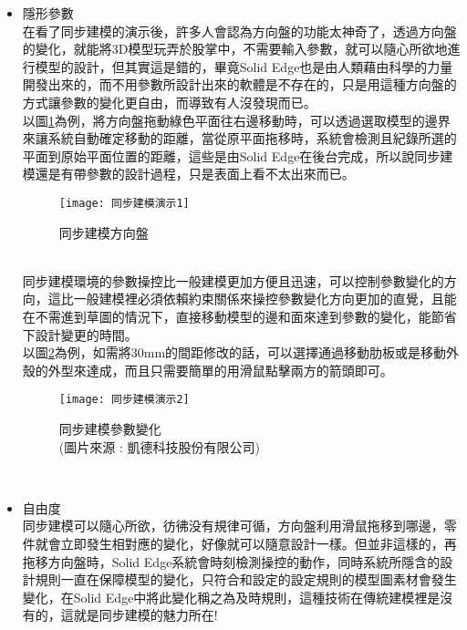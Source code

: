 \begin{itemize}
\item 隱形參數\\
在看了同步建模的演示後，許多人會認為方向盤的功能太神奇了，透過方向盤的變化，就能將3D模型玩弄於股掌中，不需要輸入參數，就可以隨心所欲地進行模型的設計，但其實這是錯的，畢竟Solid Edge也是由人類藉由科學的力量開發出來的，而不用參數所設計出來的軟體是不存在的，只是用這種方向盤的方式讓參數的變化更自由，而導致有人沒發現而已。\\
以圖\ref{2.79}為例，將方向盤拖動綠色平面往右邊移動時，可以透過選取模型的邊界來讓系統自動確定移動的距離，當從原平面拖移時，系統會檢測且紀錄所選的平面到原始平面位置的距離，這些是由Solid Edge在後台完成，所以說同步建模還是有帶參數的設計過程，只是表面上看不太出來而已。\\
\begin{figure}[hbt!]
\begin{center}
\texttt{[image: 同步建模演示1]}
\caption{\Large 同步建模方向盤}\label{2.79}
\end{center}
\end{figure}
\\
同步建模環境的參數操控比一般建模更加方便且迅速，可以控制參數變化的方向，這比一般建模裡必須依賴約束關係來操控參數變化方向更加的直覺，且能在不需進到草圖的情況下，直接移動模型的邊和面來達到參數的變化，能節省下設計變更的時間。\\
以圖\ref{2.80}為例，如需將30mm的間距修改的話，可以選擇通過移動肋板或是移動外殼的外型來達成，而且只需要簡單的用滑鼠點擊兩方的箭頭即可。\\
\begin{figure}[hbt!]
\begin{center}
\texttt{[image: 同步建模演示2]}
\caption{\Large 同步建模參數變化\\(圖片來源 : 凱德科技股份有限公司)}\label{2.80}
\end{center}
\end{figure}
\\
\item 自由度\\

同步建模可以隨心所欲，彷彿没有規律可循，方向盤利用滑鼠拖移到哪邊，零件就會立即發生相對應的變化，好像就可以隨意設計一樣。但並非這樣的，再拖移方向盤時，Solid Edge系統會時刻檢測操控的動作，同時系統所隱含的設計規則一直在保障模型的變化，只符合和設定的設定規則的模型圖素材會發生變化，在Solid Edge中將此變化稱之為及時規則，這種技術在傳統建模裡是沒有的，這就是同步建模的魅力所在!\\


\end{itemize}
